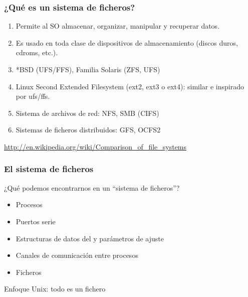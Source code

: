 \documentclass{beamer}
\begin{document}

\begin{frame}
  \frametitle{¿Qué es un sistema de ficheros?}
  \begin{enumerate}
    \item Permite al SO almacenar, organizar, manipular y recuperar datos.
    \item Es usado en toda clase de dispositivos de almacenamiento (discos duros, cdroms, etc.).
    \item *BSD (UFS/FFS), Familia Solaris (ZFS, UFS)
    \item Linux Second Extended Filesystem (ext2, ext3 o ext4): similar e inspirado por ufs/ffs.
    \item Sistema de archivos de red: NFS, SMB (CIFS)
    \item Sistemas de ficheros distribuidos: GFS, OCFS2
  \end{enumerate}

\small{\url{http://en.wikipedia.org/wiki/Comparison_of_file_systems}}

\end{frame}

\begin{frame}
  \frametitle{El sistema de ficheros}

¿Qué podemos encontrarnos en un ``sistema de ficheros''?

\pause

\begin{itemize}
\item Procesos

\pause

\item Puertos serie

\pause

\item Estructuras de datos del y parámetros de ajuste

\pause

\item Canales de comunicación entre procesos 

\pause

\item Ficheros


\end{itemize}

\pause

\begin{center}
\alert{Enfoque Unix: todo es un fichero}
\end{center}

\end{frame}
\end{document}
